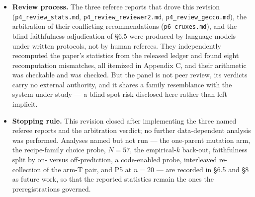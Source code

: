 \documentclass[11pt]{article}
\begin{document}
\begin{itemize}
  \texttt{deepseek-v4-pro}, \texttt{deepseek-v4-flash} and Gemini under written protocols (next
  bullet). The human author directed the programme, set the research questions, approved each
  preregistration before sampling, made the final inclusion, stopping and submission decisions,
  and is solely responsible for the content; no language model is an author. The claim a reader
  can check is the ordering, not the authorship: each preregistration commit is a git ancestor
  of the sampling it governs. The drafting of those preregistration texts, like the rest of this
  repository, was model-assisted. Two consequences are load-bearing rather than cosmetic. First, the models that wrote
  the analysis are of the same family as arms under study (\S5), so the blind-spot risk flagged
  below for the referee panel applies to the analysis code as well --- the LP oracle, the frozen
  scorer output and the referee panel's independent recomputations exist in part to bound it.
  Second, every number here was produced by a script a model wrote, which is why the scripts,
  the raw ledgers and the frozen outputs are all released: what a reader is asked to trust is
  the artifact, not the author.
\item \textbf{Review process.} The three referee reports that drove this revision (\texttt{p4\_review\_stats.md},
  \texttt{p4\_review\_reviewer2.md}, \texttt{p4\_review\_gecco.md}), the arbitration of their conflicting
  recommendations (\texttt{p6\_cruxes.md}), and the blind faithfulness adjudication of \S6.5 were produced
  by language models under written protocols, not by human referees. They independently
  recomputed the paper's statistics from the released ledger and found eight recomputation
  mismatches, all itemized in Appendix C, and their arithmetic was checkable and was checked. But
  the panel is not peer review, its verdicts carry no external authority, and it shares a family
  resemblance with the system under study --- a blind-spot risk disclosed here rather than left
  implicit.
\item \textbf{Stopping rule.} This revision closed after implementing the three named referee reports and
  the arbitration verdict; no further data-dependent analysis was performed. Analyses named but
  not run --- the one-parent mutation arm, the recipe-family choice probe, $N = 57$, the empirical-$k$
  back-out, faithfulness split by on- versus off-prediction, a code-enabled probe, interleaved
  re-collection of the arm-T pair, and P5 at $n = 20$ --- are recorded in \S6.5 and \S8 as future work,
  so that the reported statistics remain the ones the preregistrations governed.
\end{itemize}
\end{document}
